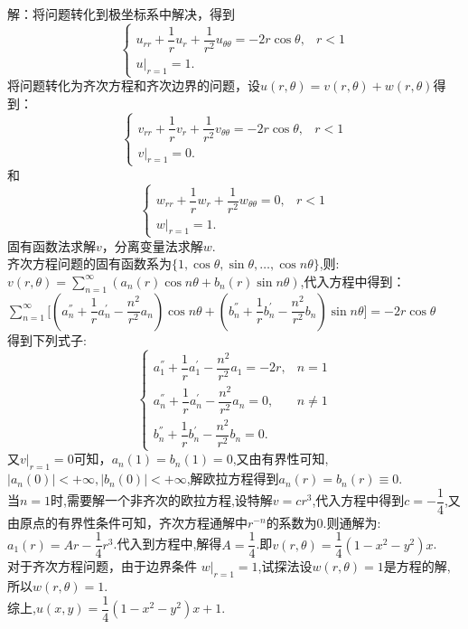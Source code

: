 \documentclass[11pt]{article}
\begin{document}
\begin{enumerate}
    解：将问题转化到极坐标系中解决，得到\\
    \[\begin{cases}
          u_{rr}+\dfrac{1}{r}u_{r}+\dfrac{1}{r^2}u_{\theta\theta} = -2r\cos \theta,& r<1\\
          u|_{r=1} = 1.
    \end{cases}\]
    将问题转化为齐次方程和齐次边界的问题，设$u(r,\theta)=v(r,\theta)+w(r,\theta)$得到：\\
    \[\begin{cases}
          v_{rr}+\dfrac{1}{r}v_{r}+\dfrac{1}{r^2}v_{\theta\theta} = -2r\cos \theta,& r<1\\
          v|_{r=1} = 0.
    \end{cases}\]
    和\[\begin{cases}
          w_{rr}+\dfrac{1}{r}w_{r}+\dfrac{1}{r^2}w_{\theta\theta} = 0,& r<1\\
          w|_{r=1} = 1.
    \end{cases}\]
    固有函数法求解$v$，分离变量法求解$w$.\\
    齐次方程问题的固有函数系为$\{1,\cos\theta,\sin\theta,\dots,\cos n\theta\}$,则:\\$v(r,\theta) = \sum\limits_{n=1}^{\infty}(a_n(r)\cos n \theta + b_n(r)\sin n \theta)$,代入方程中得到：\\$\sum\limits_{n=1}^{\infty}\big[(a_n^{''}+\dfrac{1}{r}a_n^{'}-\dfrac{n^2}{r^2}a_n)\cos n\theta +(b_n^{''}+\dfrac{1}{r}b_n^{'}-\dfrac{n^2}{r^2}b_n)\sin n \theta\big]=-2r\cos \theta$\\得到下列式子:
    \[\begin{cases}
          a_1^{''}+\dfrac{1}{r}a_1^{'}-\dfrac{n^2}{r^2}a_1=-2r,& n=1\\
          a_n^{''}+\dfrac{1}{r}a_n^{'}-\dfrac{n^2}{r^2}a_n = 0,&n \neq 1\\
          b_n^{''}+\dfrac{1}{r}b_n^{'}-\dfrac{n^2}{r^2}b_n = 0.
    \end{cases}\]
    又$v|_{r=1} = 0$可知，$a_n(1)=b_n(1)=0$,又由有界性可知,$|a_n(0)|<+\infty,|b_n(0)|<+\infty$,解欧拉方程得到$a_n(r)=b_n(r)\equiv 0$.\\当$n=1$时,需要解一个非齐次的欧拉方程,设特解$v=cr^3$,代入方程中得到$c=-\dfrac{1}{4}$,又由原点的有界性条件可知，齐次方程通解中$r^{-n}$的系数为0.则通解为:\\$a_1(r)=Ar-\dfrac{1}{4}r^3$.代入到方程中,解得$A=\dfrac{1}{4}$.即$v(r,\theta)=\dfrac{1}{4}(1-x^2-y^2)x$.
    \\对于齐次方程问题，由于边界条件 $w|_{r=1} = 1$,试探法设$w(r,\theta)=1$是方程的解,所以$w(r,\theta)=1$.
    \\综上,$u(x,y)=\dfrac{1}{4}(1-x^2-y^2)x+1$.
\end{enumerate}
\end{document}

